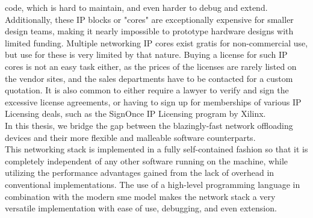 code, which is hard to maintain, and even harder to debug and
extend\cite{opencores_mission}.  Additionally, these IP blocks or
"cores" are exceptionally expensive for smaller design teams, making
it nearly impossible to prototype hardware designs with limited
funding\cite{opencores_mission}. Multiple networking IP cores exist gratis for
non-commercial use, but use for these is very limited by that nature.
Buying a license for such IP cores is not an easy task either, as the
prices of the licenses are rarely listed on the vendor sites, and the
sales departments have to be contacted for a custom quotation. It is
also common to either require a lawyer to verify and sign the excessive
license agreements, or having to sign up for memberships of various
IP Licensing deals, such as the SignOnce IP Licensing program by
Xilinx\cite{xilinx_signonce}.\\

In this thesis, we bridge the gap between the blazingly-fast network offloading
devices and their more flexible and malleable software counterparts.\\
This networking stack is implemented in a fully self-contained fashion so that
it is completely independent of any other software running on the machine, while
utilizing the performance advantages gained from the lack of overhead in
conventional implementations.
The use of a high-level programming language in combination with the modern
\gls{sme} model makes the network stack a very versatile
implementation with ease of use, debugging, and even extension.


